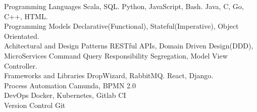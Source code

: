 

\begin{cvskills}
  \cvskill
    {Programming Languages} %
    {  Scala, SQL.} 
  \cvskill
    {} %
    {  Python, JavaScript, Bash. } 
  \cvskill
    {} %
    {  Java, C, Go, C++, HTML.} 
  \\
  \cvskill
    {Programming Models} %
    { Declarative(Functional), Stateful(Imperative), Object Orientated.} 
  \\
  \cvskill
    {Achitectural and Design Patterns} %
    {  RESTful APIs, Domain Driven Design(DDD), MicroServices}
    \cvskill
    {} %
    {  Command Query Responsibility Segregation, Model View Controller.} 
  \\
  \cvskill
    {Frameworks and Libraries} %
    {  DropWizard, RabbitMQ.} 
  \cvskill
    {} %
    {  React, Django.} 
  \\
  \cvskill
    {Process Automation}
    { Camunda, BPMN 2.0}
  \\
  \cvskill
    {DevOps} %
    { Docker, Kubernetes, Gitlab CI} %
  \\
  \cvskill
  {Version Control} %
  { Git} %

\end{cvskills}
